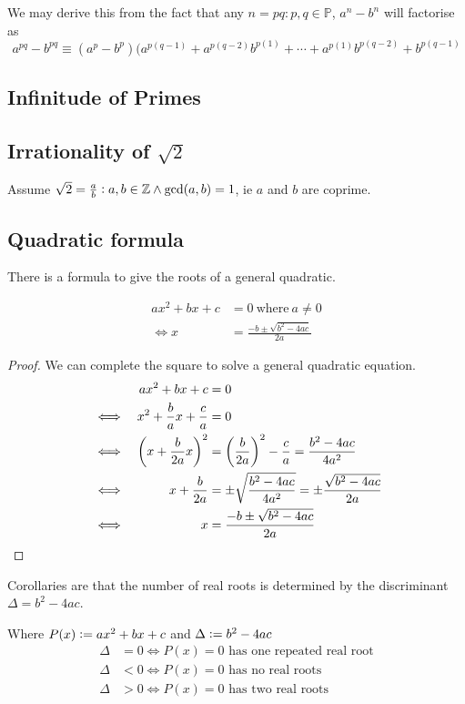 We may derive this from the fact that any \(n = pq: p, q \in \mathbb P\),
\(a^n - b^n\) will factorise as
\begin{equation}
a^{pq} - b^{pq} \equiv
 (a^p - b^p)(a^{p(q - 1)} + a^{p(q - 2)}b^{p(1)} + \dotsb +
             a^{p(1)}b^{p(q - 2)} + b^{p(q - 1)}
\end{equation}

\subsection{Infinitude of Primes}

\subsection[Irrationality of \(\sqrt 2\)]
           {Irrationality of \boldmath\(\sqrt 2\)}

Assume \(\sqrt 2 = \frac ab : a, b \in \mathbb Z \land \gcd(a, b) = 1\), ie
\(a\) and \(b\) are coprime.

\subsection{Quadratic formula} \label{sec_quad_formula}

There is a formula to give the roots of a general quadratic.
\begin{theorem}
\begin{align*}
ax^2 + bx + c &= 0\ \text{where}\ a \neq 0 \\
\iff x &= \frac{-b \pm \sqrt{b^2 - 4ac}}{2a}
\end{align*}
\end{theorem}
\begin{proof}
We can complete the square to solve a general quadratic equation.
\begin{alignat*}{2}
&&ax^2 + bx + c &= 0 \\
&\iff& x^2 + \frac{b}{a}x + \frac{c}{a} &= 0 \\
&\iff& \pqty{x + \frac{b}{2a}x}^2 &= \pqty{\frac{b}{2a}}^2 - \frac{c}{a}
    = \frac{b^2 - 4ac}{4a^2} \\
&\iff& x + \frac{b}{2a} &= \pm \sqrt{\frac{b^2 - 4ac}{4a^2}}
    = \pm \frac{\sqrt{b^2 - 4ac}}{2a} \\
&\iff& x &= \frac{-b \pm \sqrt{b^2 - 4ac}}{2a} \tag*{\qedhere}
\end{alignat*}
\end{proof}

Corollaries are that the number of real roots is determined by the
discriminant \({\Delta = b^2 - 4ac}\).
\begin{theorem}
Where \(P(x) \vcentcolon= ax^2 + bx + c\) and \(\Delta \vcentcolon= b^2 - 4ac\)
\begin{align*}
\Delta &= 0 \iff \text{\(P(x) = 0\) has one repeated real root} \\
\Delta &< 0 \iff \text{\(P(x) = 0\) has no real roots} \\
\Delta &> 0 \iff \text{\(P(x) = 0\) has two real roots}
\end{align*}
\end{theorem}


